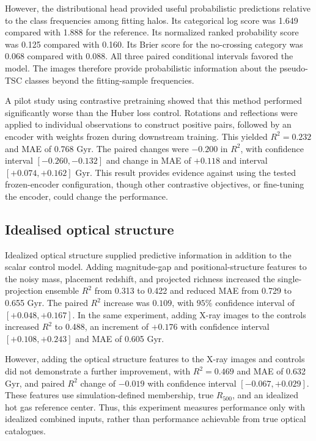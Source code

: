 However, the distributional head provided useful probabilistic predictions relative to the class frequencies among fitting halos.
Its categorical log score was 1.649 compared with 1.888 for the reference.
Its normalized ranked probability score was 0.125 compared with 0.160.
Its Brier score for the no-crossing category was 0.068 compared with 0.088.
All three paired conditional intervals favored the model.
The images therefore provide probabilistic information about the pseudo-TSC classes beyond the fitting-sample frequencies.

A pilot study using contrastive pretraining showed that this method performed significantly worse than the Huber loss control.
Rotations and reflections were applied to individual observations to construct positive pairs, followed by an encoder with weights frozen during downstream training.
This yielded $R^2=0.232$ and MAE of 0.768 Gyr.
The paired changes were $-0.200$ in $R^2$, with confidence interval $[-0.260, -0.132]$ and change in MAE of $+0.118$ and interval $[+0.074, +0.162]$ Gyr.
This result provides evidence against using the tested frozen-encoder configuration, though other contrastive objectives, or fine-tuning the encoder, could change the performance.

\subsection{Idealised optical structure}
\label{sec:optical}

Idealized optical structure supplied predictive information in addition to the scalar control model.
Adding magnitude-gap and positional-structure features to the noisy mass, placement redshift, and projected richness increased the single-projection ensemble $R^2$ from 0.313 to 0.422 and reduced MAE from 0.729 to 0.655 Gyr.
The paired $R^2$ increase was $0.109$, with $95\%$ confidence interval of $[+0.048, +0.167]$.
In the same experiment, adding X-ray images to the controls increased $R^2$ to 0.488, an increment of $+0.176$ with confidence interval $[+0.108, +0.243]$ and MAE of 0.605 Gyr.

However, adding the optical structure features to the X-ray images and controls did not demonstrate a further improvement, with $R^2=0.469$ and MAE of 0.632 Gyr, and paired $R^2$ change of $-0.019$ with confidence interval $[-0.067, +0.029]$.
These features use simulation-defined membership, true $R_{500}$, and an idealized hot gas reference center.
Thus, this experiment measures performance only with idealized combined inputs, rather than performance achievable from true optical catalogues.

